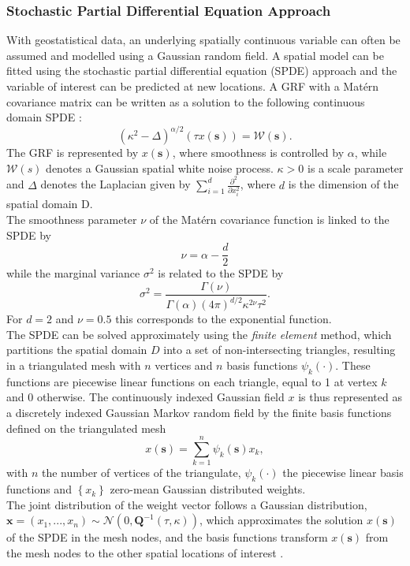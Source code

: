 \subsubsection{Stochastic Partial Differential Equation Approach}
With geostatistical data, an underlying spatially continuous variable can often be assumed and modelled using a Gaussian random field. A spatial model can be fitted using the stochastic partial differential equation (SPDE) approach and the variable of interest can be predicted at new locations. A GRF with a Matérn covariance matrix can be written as a solution to the following continuous domain SPDE \autocite[][]{whittle1963stochastic}:
\begin{equation}
    \left(\kappa^2-\Delta\right)^{\alpha/2}\left(\tau x\left(\pmb{s}\right)\right) = \mathcal{W}\left(\pmb{s}\right).
\end{equation}
The GRF is represented by $x\left(\pmb{s}\right)$, where smoothness is controlled by $\alpha$, while $\mathcal{W}\left(s\right)$ denotes a Gaussian spatial white noise process. $\kappa>0$ is a scale parameter and $\Delta$ denotes the Laplacian given by $\sum_{i=1}^d\frac{\partial^2}{\partial x_i^2}$, where $d$ is the dimension of the spatial domain D. \\
The smoothness parameter $\nu$ of the Matérn covariance function is linked to the SPDE by
\begin{equation*}
    \nu=\alpha-\frac{d}{2}
\end{equation*}
while the marginal variance $\sigma^2$ is related to the SPDE by
\begin{equation*}
    \sigma^2=\frac{\Gamma\left(\nu\right)}{\Gamma\left(\alpha\right)\left(4\pi\right)^{d/2}\kappa^{2\nu}\tau^2}.
\end{equation*}
For $d=2$ and $\nu=0.5$ this corresponds to the exponential function. \\
The SPDE can be solved approximately using the \textit{finite element} method, which partitions the spatial domain $D$ into a set of non-intersecting triangles, resulting in a triangulated mesh with $n$ vertices and $n$ basis functions $\psi_k\left(\cdot\right)$. These functions are piecewise linear functions on each triangle, equal to 1 at vertex $k$ and 0 otherwise. The continuously indexed Gaussian field $x$ is thus represented as a discretely indexed Gaussian Markov random field by the finite basis functions defined on the triangulated mesh
\begin{equation}
    x\left(\pmb{s}\right)=\sum_{k=1}^n\psi_k\left(\pmb{s}\right)x_k,
\end{equation}
with $n$ the number of vertices of the triangulate, $\psi_k\left(\cdot\right)$ the piecewise linear basis functions and $\left\lbrace x_k\right\rbrace$ zero-mean Gaussian distributed weights. \\
The joint distribution of the weight vector follows a Gaussian distribution, $\pmb{x}=\left(x_1,... ,x_n\right)\sim\mathcal{N}\left(0, \pmb{Q}^{-1}\left(\tau, \kappa\right)\right)$, which approximates the solution $x\left(\pmb{s}\right)$ of the SPDE in the mesh nodes, and the basis functions transform $x\left(\pmb{s}\right)$ from the mesh nodes to the other spatial locations of interest \autocite[][]{lindgren2011explicit}.